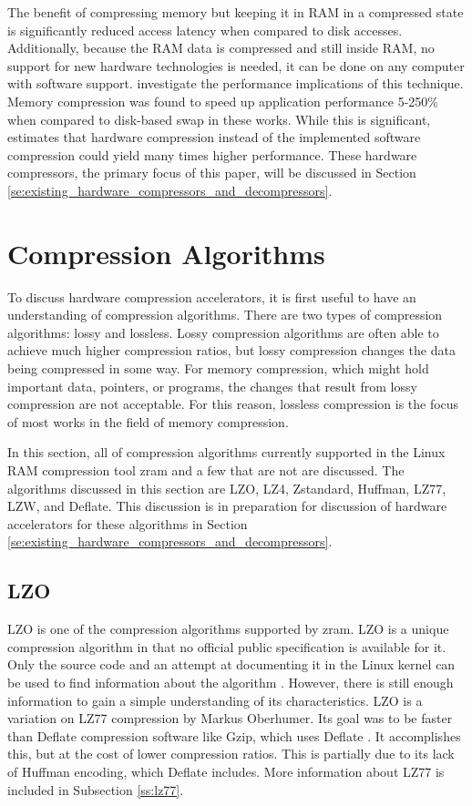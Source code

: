 \documentclass[doublespace,nopageskip]{VTthesis}
\begin{document}
The benefit of compressing memory but keeping it in RAM in a compressed state is significantly reduced access latency when compared to disk accesses. Additionally, because the RAM data is compressed and still inside RAM, no support for new hardware technologies is needed, it can be done on any computer with software support. \cite{memorycompressionperformance, compressedmemoryimproveperformance} investigate the performance implications of this technique. Memory compression was found to speed up application performance 5-250\% when compared to disk-based swap in these works. While this is significant, \cite{memorycompressionperformance} estimates that hardware compression instead of the implemented software compression could yield many times higher performance. These hardware compressors, the primary focus of this paper, will be discussed in Section \ref{se:existing_hardware_compressors_and_decompressors}.

\section{Compression Algorithms}\label{se:compression_algorithms}
To discuss hardware compression accelerators, it is first useful to have an understanding of compression algorithms. There are two types of compression algorithms: lossy and lossless. Lossy compression algorithms are often able to achieve much higher compression ratios, but lossy compression changes the data being compressed in some way. For memory compression, which might hold important data, pointers, or programs, the changes that result from lossy compression are not acceptable. For this reason, lossless compression is the focus of most works in the field of memory compression.

In this section, all of compression algorithms currently supported in the Linux RAM compression tool zram and a few that are not are discussed. The algorithms discussed in this section are LZO, LZ4, Zstandard, Huffman, LZ77, LZW, and Deflate. This discussion is in preparation for discussion of hardware accelerators for these algorithms in Section \ref{se:existing_hardware_compressors_and_decompressors}.

\subsection{LZO}\label{ss:lzo}
LZO is one of the compression algorithms supported by zram. LZO is a unique compression algorithm in that no official public specification is available for it. Only the source code and an attempt at documenting it in the Linux kernel can be used to find information about the algorithm \cite{linuxlzo}. However, there is still enough information to gain a simple understanding of its characteristics. LZO is a variation on LZ77 compression by Markus Oberhumer. Its goal was to be faster than Deflate compression software like Gzip, which uses Deflate \cite{lzo}. It accomplishes this, but at the cost of lower compression ratios. This is partially due to its lack of Huffman encoding, which Deflate includes. More information about LZ77 is included in Subsection \ref{ss:lz77}.
\end{document}
